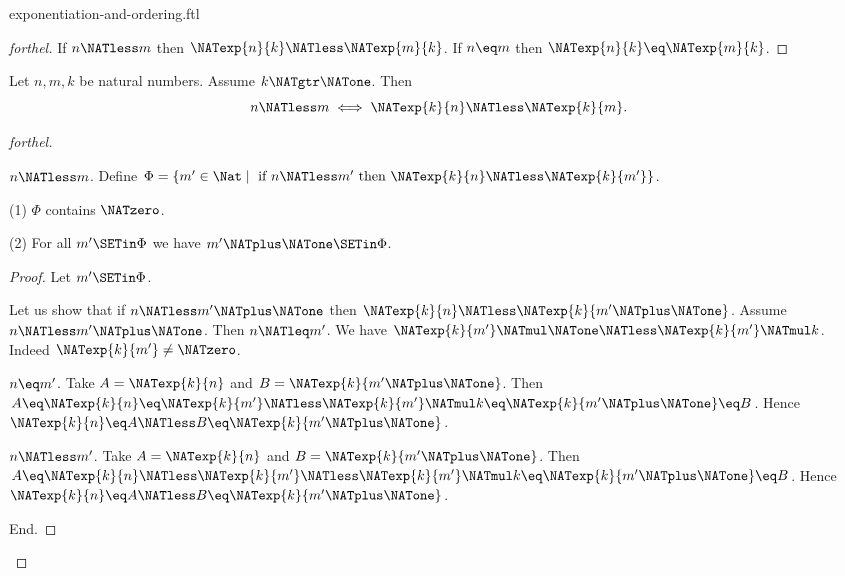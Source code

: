\documentclass{stex}
\begin{document}
\begin{smodule}{exponentiation-and-ordering.ftl}
\begin{proof}[forthel]
  If $n \NATless m$ then $\NATexp{n}{k} \NATless \NATexp{m}{k}$.
  If $n \eq m$ then $\NATexp{n}{k} \eq \NATexp{m}{k}$.
\end{proof}

\begin{proposition}[forthel,id=ARITHMETIC_09_3349764703780864]
  Let $n, m, k$ be natural numbers.
  Assume $k \NATgtr \NATone$.
  Then \[ n \NATless m \iff \NATexp{k}{n} \NATless \NATexp{k}{m}. \]
\end{proposition}
\begin{proof}[forthel]
  \begin{case}{$n \NATless m$.}
    Define $\Phi = \{ m' \in \Nat \mid\text{ if }n \NATless m'\text{ then }\NATexp{k}{n} \NATless \NATexp{k}{m'} \}$.

    (1) $\Phi$ contains $\NATzero$.

    (2) For all $m' \SETin \Phi$ we have $m' \NATplus \NATone \SETin \Phi$.
    \begin{proof}
      Let $m' \SETin \Phi$.

      Let us show that if $n \NATless m' \NATplus \NATone$ then $\NATexp{k}{n} \NATless \NATexp{k}{m' \NATplus \NATone}$.
        Assume $n \NATless m' \NATplus \NATone$.
        Then $n \NATleq m'$.
        We have $\NATexp{k}{m'} \NATmul \NATone \NATless \NATexp{k}{m'} \NATmul k$.
        Indeed $\NATexp{k}{m'} \neq \NATzero$.

        \begin{case}{$n \eq m'$.}
          Take $A = \NATexp{k}{n}$ and $B = \NATexp{k}{m' \NATplus \NATone}$. %
          Then $A
            \eq \NATexp{k}{n}
            \eq \NATexp{k}{m'}
            \NATless \NATexp{k}{m'} \NATmul k
            \eq \NATexp{k}{m' \NATplus \NATone}
            \eq B$.
          Hence $\NATexp{k}{n} \eq A \NATless B \eq \NATexp{k}{m' \NATplus \NATone}$.
        \end{case}

        \begin{case}{$n \NATless m'$.}
          Take $A = \NATexp{k}{n}$ and $B = \NATexp{k}{m' \NATplus \NATone}$. %
          Then $A
            \eq \NATexp{k}{n}
            \NATless \NATexp{k}{m'}
            \NATless \NATexp{k}{m'} \NATmul k
            \eq \NATexp{k}{m' \NATplus \NATone}
            \eq B$.
          Hence $\NATexp{k}{n} \eq A \NATless B \eq \NATexp{k}{m' \NATplus \NATone}$.
        \end{case}
      End.
    \end{proof}


\end{case}
\end{proof}
\end{smodule}
\end{document}

